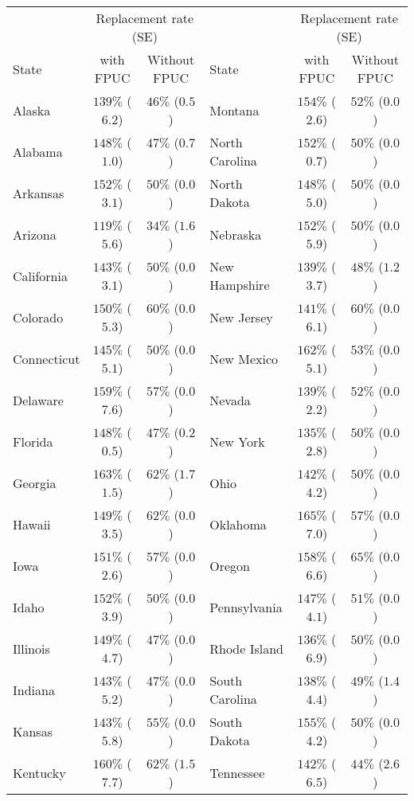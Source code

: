 \begin{tabular}{lcclcc}
\toprule
& \multicolumn{2}{c}{Replacement rate (SE)} & & \multicolumn{2}{c}{Replacement rate (SE)} \\ 
 \cmidrule(lr){2-3}\cmidrule(lr){5-6}
State & with FPUC & Without FPUC & State & with FPUC & Without FPUC \\ 
\midrule
Alaska & $139\%$ ($6.2$)  & $46\%$ ($0.5$)  & Montana & $154\%$ ($2.6$)  & $52\%$ ($0.0$)  \\ 
Alabama & $148\%$ ($1.0$)  & $47\%$ ($0.7$)  & North Carolina & $152\%$ ($0.7$)  & $50\%$ ($0.0$)  \\ 
Arkansas & $152\%$ ($3.1$)  & $50\%$ ($0.0$)  & North Dakota & $148\%$ ($5.0$)  & $50\%$ ($0.0$)  \\ 
Arizona & $119\%$ ($5.6$)  & $34\%$ ($1.6$)  & Nebraska & $152\%$ ($5.9$)  & $50\%$ ($0.0$)  \\ 
California & $143\%$ ($3.1$)  & $50\%$ ($0.0$)  & New Hampshire & $139\%$ ($3.7$)  & $48\%$ ($1.2$)  \\ 
Colorado & $150\%$ ($5.3$)  & $60\%$ ($0.0$)  & New Jersey & $141\%$ ($6.1$)  & $60\%$ ($0.0$)  \\ 
Connecticut & $145\%$ ($5.1$)  & $50\%$ ($0.0$)  & New Mexico & $162\%$ ($5.1$)  & $53\%$ ($0.0$)  \\ 
Delaware & $159\%$ ($7.6$)  & $57\%$ ($0.0$)  & Nevada & $139\%$ ($2.2$)  & $52\%$ ($0.0$)  \\ 
Florida & $148\%$ ($0.5$)  & $47\%$ ($0.2$)  & New York & $135\%$ ($2.8$)  & $50\%$ ($0.0$)  \\ 
Georgia & $163\%$ ($1.5$)  & $62\%$ ($1.7$)  & Ohio & $142\%$ ($4.2$)  & $50\%$ ($0.0$)  \\ 
Hawaii & $149\%$ ($3.5$)  & $62\%$ ($0.0$)  & Oklahoma & $165\%$ ($7.0$)  & $57\%$ ($0.0$)  \\ 
Iowa & $151\%$ ($2.6$)  & $57\%$ ($0.0$)  & Oregon & $158\%$ ($6.6$)  & $65\%$ ($0.0$)  \\ 
Idaho & $152\%$ ($3.9$)  & $50\%$ ($0.0$)  & Pennsylvania & $147\%$ ($4.1$)  & $51\%$ ($0.0$)  \\ 
Illinois & $149\%$ ($4.7$)  & $47\%$ ($0.0$)  & Rhode Island & $136\%$ ($6.9$)  & $50\%$ ($0.0$)  \\ 
Indiana & $143\%$ ($5.2$)  & $47\%$ ($0.0$)  & South Carolina & $138\%$ ($4.4$)  & $49\%$ ($1.4$)  \\ 
Kansas & $143\%$ ($5.8$)  & $55\%$ ($0.0$)  & South Dakota & $155\%$ ($4.2$)  & $50\%$ ($0.0$)  \\ 
Kentucky & $160\%$ ($7.7$)  & $62\%$ ($1.5$)  & Tennessee & $142\%$ ($6.5$)  & $44\%$ ($2.6$)  \\ 

\end{tabular}

